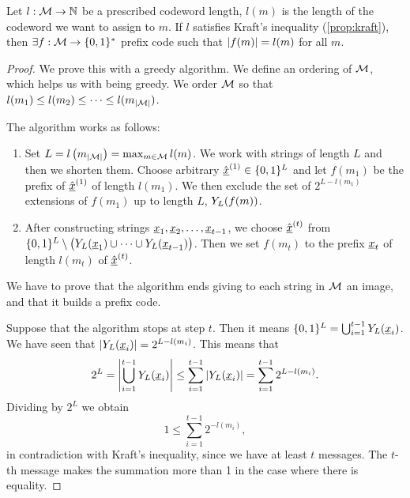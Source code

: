 \begin{thm}
	Let $l : \mathcal{M} \to \mathbb{N}$ be a prescribed codeword length, \ie $l(m)$ is the length of the codeword we want to assign to $m$.
	If $l$ satisfies Kraft's inequality (\cref{prop:kraft}), then 
	$\exists f : \mathcal{M} \to \{0, 1\}^*$ prefix code such that $\left|{f(m)}\right| = l(m)$ for all $m$.
\end{thm}

\begin{proof}
	We prove this with a greedy algorithm.
	We define an ordering of $\mathcal{M}$, which helps us with being greedy.
	We order $\mathcal{M}$ so that $l(m_1) \le l(m_2) \le \dots \le l(m_{\left|{\mathcal{M}}\right|})$.

	The algorithm works as follows:
	\begin{enumerate}
		\item Set $L = l \left( m_{\left|{\mathcal{M}}\right|} \right) = \max_{m \in \mathcal{M}} l(m)$.
			We work with strings of length $L$ and then we shorten them.
			Choose arbitrary $\hat{\underline{x}}^{(1)} \in \{0, 1\}^L$ and let $f(m_1)$ be the prefix of $\hat{\underline{x}}^{(1)}$ of length $l(m_1)$.
			We then exclude the set of $2^{L - l(m_1)}$ extensions of $f(m_1)$ up to length $L$, \ie $Y_L(f(m))$.

		\item After constructing strings $\underline{x}_1,\underline{x}_2, \dots, \underline{x}_{t-1}$, we choose $\hat{\underline{x}}^{(t)}$ from $\{0, 1\}^L \setminus \left( Y_L(\underline{x}_1) \cup \dots \cup Y_L(\underline{x}_{t-1}) \right)$.
			Then we set $f(m_t)$ to the prefix $\underline{x}_t$ of length $l(m_t)$ of $\hat{\underline{x}}^{(t)}$.
	\end{enumerate}

	We have to prove that the algorithm ends giving to each string in $\mathcal{M}$ an image, and that it builds a prefix code.

	Suppose that the algorithm stops at step $t$.
	Then it means $\{0, 1\}^L = \bigcup_{i = 1}^{t-1} Y_L(\underline{x}_i)$. We have seen that $\left|{Y_L(\underline{x}_i)}\right| = 2^{L - l(m_i)}$. This means that
	\begin{equation*}
		2^L
		=
		\left|{\bigcup_{i = 1}^{t-1} Y_L(\underline{x}_i)}\right|
		\leq
		\sum_{i = 1}^{t-1} \left|{Y_L(\underline{x}_i)}\right|
		=
		\sum_{i = 1}^{t-1} 2^{L-l(m_i)}.
	\end{equation*}
	Dividing by $2^L$ we obtain
	\begin{equation*}
		1 \leq \sum_{i = 1}^{t-1} 2^{-l(m_i)},
	\end{equation*}
	in contradiction with Kraft's inequality, since we have at least $t$ messages. The $t$-th message makes the summation more than 1 in the case where there is equality. 


\end{proof}
